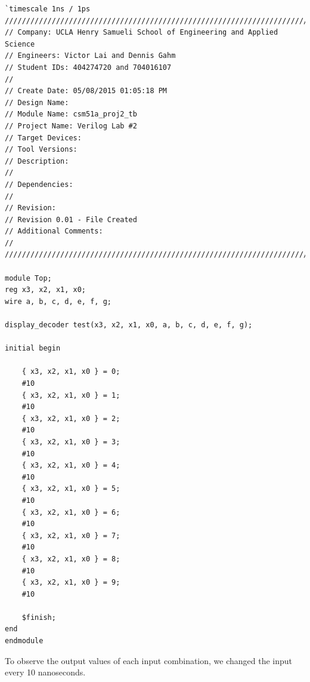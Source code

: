 \documentclass{article}
\begin{document}
\begin{verbatim}
`timescale 1ns / 1ps
//////////////////////////////////////////////////////////////////////////////
// Company: UCLA Henry Samueli School of Engineering and Applied Science
// Engineers: Victor Lai and Dennis Gahm
// Student IDs: 404274720 and 704016107
// 
// Create Date: 05/08/2015 01:05:18 PM
// Design Name: 
// Module Name: csm51a_proj2_tb
// Project Name: Verilog Lab #2
// Target Devices: 
// Tool Versions: 
// Description: 
// 
// Dependencies: 
// 
// Revision:
// Revision 0.01 - File Created
// Additional Comments:
// 
//////////////////////////////////////////////////////////////////////////////

module Top;
reg x3, x2, x1, x0;
wire a, b, c, d, e, f, g;

display_decoder test(x3, x2, x1, x0, a, b, c, d, e, f, g);

initial begin
    
    { x3, x2, x1, x0 } = 0;
    #10
    { x3, x2, x1, x0 } = 1;
    #10
    { x3, x2, x1, x0 } = 2;
    #10
    { x3, x2, x1, x0 } = 3;
    #10
    { x3, x2, x1, x0 } = 4;
    #10
    { x3, x2, x1, x0 } = 5;
    #10
    { x3, x2, x1, x0 } = 6;
    #10
    { x3, x2, x1, x0 } = 7;
    #10
    { x3, x2, x1, x0 } = 8;
    #10
    { x3, x2, x1, x0 } = 9;
    #10
        
    $finish;
end
endmodule

\end{verbatim}

To observe the output values of each input combination, we changed the input 
every 10 nanoseconds.

\end{document}
